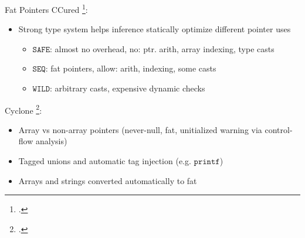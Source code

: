 \documentclass[aspectratio=169]{beamer}
\begin{document}
\begin{frame}{Fat Pointers}
\footnotesize
CCured \footcite{necula_ccured:_2002}:
      \begin{itemize}
          \item Strong type system helps \alert{inference} statically \alert{optimize} different pointer uses %
              \begin{itemize}
                  \item $\texttt{SAFE}$: almost no overhead, no: ptr. arith, array indexing, type casts %
                  \item $\texttt{SEQ}$: fat pointers, allow: arith, indexing, some casts
                  \item $\texttt{WILD}$: arbitrary casts, expensive dynamic checks %
                \end{itemize}
      \end{itemize}

Cyclone \footcite{jim_cyclone:_2002}: %
      \begin{itemize}
          \item Array vs non-array pointers (never-null, fat, unitialized warning via control-flow analysis) %
          \item Tagged unions and automatic tag injection (e.g. $\texttt{printf}$)
          \item Arrays and strings converted automatically to fat
      \end{itemize}
\vspace{0.2in}
\end{frame}
\end{document}
